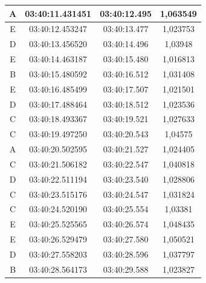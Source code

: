 \begin{longtable}{|ccc|c|}
  \multicolumn{1}{|c|}{A}    & \multicolumn{1}{c|}{03:40:11.431451} & 03:40:12.495       & 1,063549   \\ \hline
  \multicolumn{1}{|c|}{E}    & \multicolumn{1}{c|}{03:40:12.453247} & 03:40:13.477       & 1,023753   \\ \hline
  \multicolumn{1}{|c|}{D}    & \multicolumn{1}{c|}{03:40:13.456520} & 03:40:14.496       & 1,03948    \\ \hline
  \multicolumn{1}{|c|}{E}    & \multicolumn{1}{c|}{03:40:14.463187} & 03:40:15.480       & 1,016813   \\ \hline
  \multicolumn{1}{|c|}{B}    & \multicolumn{1}{c|}{03:40:15.480592} & 03:40:16.512       & 1,031408   \\ \hline
  \multicolumn{1}{|c|}{E}    & \multicolumn{1}{c|}{03:40:16.485499} & 03:40:17.507       & 1,021501   \\ \hline
  \multicolumn{1}{|c|}{D}    & \multicolumn{1}{c|}{03:40:17.488464} & 03:40:18.512       & 1,023536   \\ \hline
  \multicolumn{1}{|c|}{C}    & \multicolumn{1}{c|}{03:40:18.493367} & 03:40:19.521       & 1,027633   \\ \hline
  \multicolumn{1}{|c|}{C}    & \multicolumn{1}{c|}{03:40:19.497250} & 03:40:20.543       & 1,04575    \\ \hline
  \multicolumn{1}{|c|}{A}    & \multicolumn{1}{c|}{03:40:20.502595} & 03:40:21.527       & 1,024405   \\ \hline
  \multicolumn{1}{|c|}{C}    & \multicolumn{1}{c|}{03:40:21.506182} & 03:40:22.547       & 1,040818   \\ \hline
  \multicolumn{1}{|c|}{D}    & \multicolumn{1}{c|}{03:40:22.511194} & 03:40:23.540       & 1,028806   \\ \hline
  \multicolumn{1}{|c|}{C}    & \multicolumn{1}{c|}{03:40:23.515176} & 03:40:24.547       & 1,031824   \\ \hline
  \multicolumn{1}{|c|}{C}    & \multicolumn{1}{c|}{03:40:24.520190} & 03:40:25.554       & 1,03381    \\ \hline
  \multicolumn{1}{|c|}{E}    & \multicolumn{1}{c|}{03:40:25.525565} & 03:40:26.574       & 1,048435   \\ \hline
  \multicolumn{1}{|c|}{E}    & \multicolumn{1}{c|}{03:40:26.529479} & 03:40:27.580       & 1,050521   \\ \hline
  \multicolumn{1}{|c|}{D}    & \multicolumn{1}{c|}{03:40:27.558203} & 03:40:28.596       & 1,037797   \\ \hline
  \multicolumn{1}{|c|}{B}    & \multicolumn{1}{c|}{03:40:28.564173} & 03:40:29.588       & 1,023827   \\ \hline

\end{longtable}
